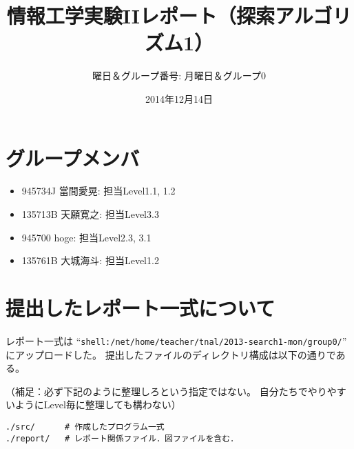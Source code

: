 \documentclass[10pt]{jarticle}
\begin{document}
\title{情報工学実験IIレポート（探索アルゴリズム1）}
\author{曜日＆グループ番号: 月曜日＆グループ0} %
\date{2014年12月14日}

\maketitle

\begin{abstract}
% 
\end{abstract}

\section*{グループメンバ}
\begin{itemize}
 \item 945734J 當間愛晃: 担当Level1.1, 1.2
 \item 135713B 天願寛之: 担当Level3.3
 \item 945700 hoge: 担当Level2.3, 3.1
 \item 135761B 大城海斗: 担当Level1.2
\end{itemize}

\section*{提出したレポート一式について}
レポート一式は
``\verb|shell:/net/home/teacher/tnal/2013-search1-mon/group0/|''
にアップロードした。
提出したファイルのディレクトリ構成は以下の通りである。

\vspace{+0.5cm}
（補足：必ず下記のように整理しろという指定ではない。
自分たちでやりやすいようにLevel毎に整理しても構わない）
\begin{breakbox}
\begin{verbatim}
./src/      # 作成したプログラム一式
./report/   # レポート関係ファイル．図ファイルを含む．
\end{verbatim}
\end{breakbox}
\end{document}
